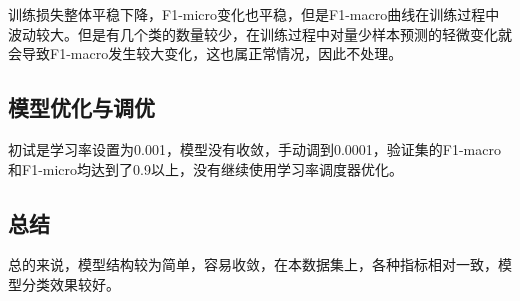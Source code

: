 \documentclass{article}
\begin{document}
	训练损失整体平稳下降，F1-micro变化也平稳，但是F1-macro曲线在训练过程中波动较大。但是有几个类的数量较少，在训练过程中对量少样本预测的轻微变化就会导致F1-macro发生较大变化，这也属正常情况，因此不处理。
	
	\subsection{模型优化与调优}
	初试是学习率设置为0.001，模型没有收敛，手动调到0.0001，验证集的F1-macro和F1-micro均达到了0.9以上，没有继续使用学习率调度器优化。
	
	
	\subsection{总结}
	总的来说，模型结构较为简单，容易收敛，在本数据集上，各种指标相对一致，模型分类效果较好。
	
	
\end{document}
